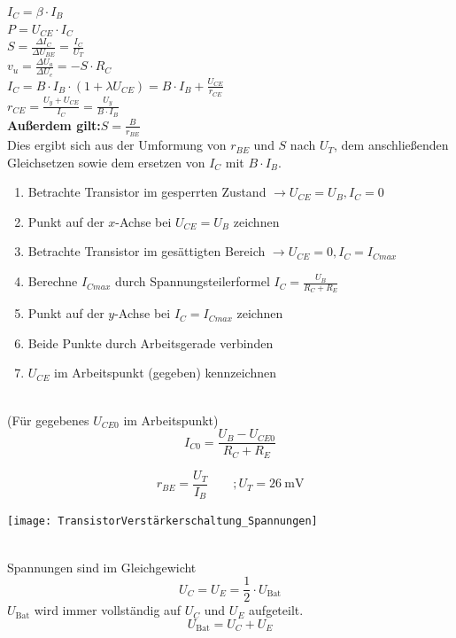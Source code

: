 \documentclass[a5paper, 12pt, twoside]{scrartcl}
\begin{document}
\dotfill\(\displaystyle I_C = \beta \cdot I_B\)\\[1em]
\dotfill\(\displaystyle P = U_{CE} \cdot I_C\)\\[1em]
\dotfill\(\displaystyle S = \frac{\Delta I_C}{\Delta U_{BE}} = \frac{I_C}{U_T}\)\\[1em]
\dotfill\(\displaystyle v_u = \frac{\Delta U_a}{\Delta U_e} = -S \cdot R_C\)\\[1em]
\dotfill\(\displaystyle I_C = B \cdot I_B \cdot (1 + \lambda U_{CE}) = B \cdot I_B + \frac{U_{CE}}{r_{CE}}\)\\[1em]
\dotfill\(\displaystyle r_{CE} = \frac{U_y + U_{CE}}{I_C} = \frac{U_y}{B \cdot I_B}\)\\[1em]
\textbf{\textcolor{myblue}{Außerdem gilt:\dotfill\(\displaystyle S = \frac{B}{r_{BE}}\)}}\\[1em]
\textcolor{myblue}{Dies ergibt sich aus der Umformung von \(r_{BE}\) und \(S\) nach \(U_T\), dem anschließenden Gleichsetzen sowie dem ersetzen von \(I_C\) mit \(B \cdot I_B\).}

\vspace{.5cm}

\begin{enumerate}
\item Betrachte Transistor im gesperrten Zustand \(\rightarrow U_{CE} = U_B, I_C = 0\)
\item Punkt auf der \(x\)-Achse bei \(U_{CE} = U_B\) zeichnen
\item Betrachte Transistor im gesättigten Bereich \(\rightarrow U_{CE} = 0, I_C = I_{Cmax}\)
\item Berechne \(I_{Cmax}\) durch Spannungsteilerformel \(I_C = \frac{U_B}{R_C + R_E}\)
\item Punkt auf der \(y\)-Achse bei \(I_C = I_{Cmax}\) zeichnen
\item Beide Punkte durch Arbeitsgerade verbinden
\item \(U_{CE}\) im Arbeitspunkt (gegeben) kennzeichnen
\end{enumerate}

\clearpage

\\
(Für gegebenes \(U_{CE0}\) im Arbeitspunkt)
\[I_{C0} = \frac{U_B - U_{CE0}}{R_C + R_E}\]

\[r_{BE} = \frac{U_T}{I_B} \qquad; U_T = \SI{26}{\milli\volt}\]

{\centering
  \texttt{[image: TransistorVerstärkerschaltung\_Spannungen]}
  \par%
}


\\
Spannungen sind im Gleichgewicht
\[U_C = U_E = \frac{1}{2} \cdot U_{\text{Bat}}\]
\(U_{\text{Bat}}\) wird immer vollständig auf \(U_C\) und \(U_E\) aufgeteilt.
\[U_{\text{Bat}} = U_C + U_E\]
\end{document}
